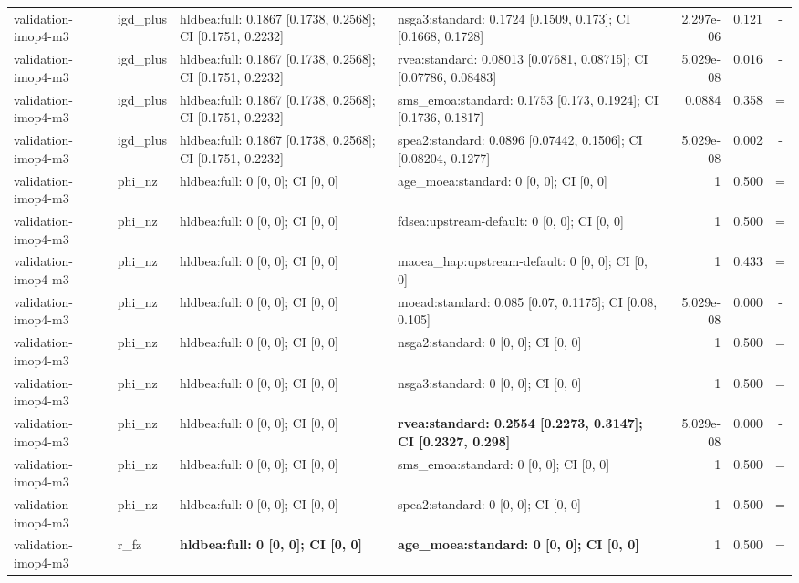\begin{tabular}{llllrrc}
validation-imop4-m3 & igd\_plus & hldbea:full: 0.1867 [0.1738, 0.2568]; CI [0.1751, 0.2232] & nsga3:standard: 0.1724 [0.1509, 0.173]; CI [0.1668, 0.1728] & 2.297e-06 & 0.121 & - \\
validation-imop4-m3 & igd\_plus & hldbea:full: 0.1867 [0.1738, 0.2568]; CI [0.1751, 0.2232] & rvea:standard: 0.08013 [0.07681, 0.08715]; CI [0.07786, 0.08483] & 5.029e-08 & 0.016 & - \\
validation-imop4-m3 & igd\_plus & hldbea:full: 0.1867 [0.1738, 0.2568]; CI [0.1751, 0.2232] & sms\_emoa:standard: 0.1753 [0.173, 0.1924]; CI [0.1736, 0.1817] & 0.0884 & 0.358 & = \\
validation-imop4-m3 & igd\_plus & hldbea:full: 0.1867 [0.1738, 0.2568]; CI [0.1751, 0.2232] & spea2:standard: 0.0896 [0.07442, 0.1506]; CI [0.08204, 0.1277] & 5.029e-08 & 0.002 & - \\
validation-imop4-m3 & phi\_nz & hldbea:full: 0 [0, 0]; CI [0, 0] & age\_moea:standard: 0 [0, 0]; CI [0, 0] & 1 & 0.500 & = \\
validation-imop4-m3 & phi\_nz & hldbea:full: 0 [0, 0]; CI [0, 0] & fdsea:upstream-default: 0 [0, 0]; CI [0, 0] & 1 & 0.500 & = \\
validation-imop4-m3 & phi\_nz & hldbea:full: 0 [0, 0]; CI [0, 0] & maoea\_hap:upstream-default: 0 [0, 0]; CI [0, 0] & 1 & 0.433 & = \\
validation-imop4-m3 & phi\_nz & hldbea:full: 0 [0, 0]; CI [0, 0] & moead:standard: 0.085 [0.07, 0.1175]; CI [0.08, 0.105] & 5.029e-08 & 0.000 & - \\
validation-imop4-m3 & phi\_nz & hldbea:full: 0 [0, 0]; CI [0, 0] & nsga2:standard: 0 [0, 0]; CI [0, 0] & 1 & 0.500 & = \\
validation-imop4-m3 & phi\_nz & hldbea:full: 0 [0, 0]; CI [0, 0] & nsga3:standard: 0 [0, 0]; CI [0, 0] & 1 & 0.500 & = \\
validation-imop4-m3 & phi\_nz & hldbea:full: 0 [0, 0]; CI [0, 0] & \textbf{rvea:standard: 0.2554 [0.2273, 0.3147]; CI [0.2327, 0.298]} & 5.029e-08 & 0.000 & - \\
validation-imop4-m3 & phi\_nz & hldbea:full: 0 [0, 0]; CI [0, 0] & sms\_emoa:standard: 0 [0, 0]; CI [0, 0] & 1 & 0.500 & = \\
validation-imop4-m3 & phi\_nz & hldbea:full: 0 [0, 0]; CI [0, 0] & spea2:standard: 0 [0, 0]; CI [0, 0] & 1 & 0.500 & = \\
validation-imop4-m3 & r\_fz & \textbf{hldbea:full: 0 [0, 0]; CI [0, 0]} & \textbf{age\_moea:standard: 0 [0, 0]; CI [0, 0]} & 1 & 0.500 & = \\

\end{tabular}
